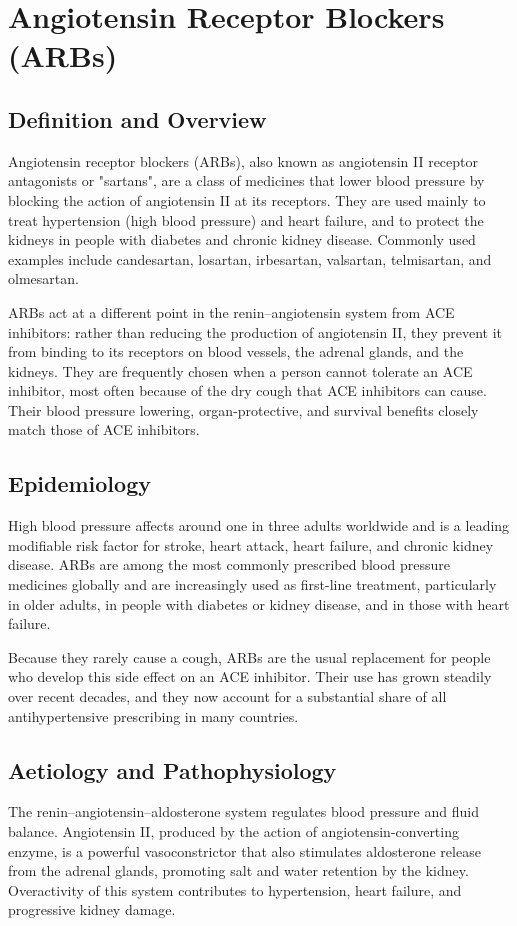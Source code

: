 \chapter{Angiotensin Receptor Blockers (ARBs)}

\section*{Definition and Overview}
Angiotensin receptor blockers (ARBs), also known as angiotensin II receptor antagonists or "sartans", are a class of medicines that lower blood pressure by blocking the action of angiotensin II at its receptors. They are used mainly to treat hypertension (high blood pressure) and heart failure, and to protect the kidneys in people with diabetes and chronic kidney disease. Commonly used examples include candesartan, losartan, irbesartan, valsartan, telmisartan, and olmesartan.

ARBs act at a different point in the renin--angiotensin system from ACE inhibitors: rather than reducing the production of angiotensin II, they prevent it from binding to its receptors on blood vessels, the adrenal glands, and the kidneys. They are frequently chosen when a person cannot tolerate an ACE inhibitor, most often because of the dry cough that ACE inhibitors can cause. Their blood pressure lowering, organ-protective, and survival benefits closely match those of ACE inhibitors.

\section*{Epidemiology}
High blood pressure affects around one in three adults worldwide and is a leading modifiable risk factor for stroke, heart attack, heart failure, and chronic kidney disease. ARBs are among the most commonly prescribed blood pressure medicines globally and are increasingly used as first-line treatment, particularly in older adults, in people with diabetes or kidney disease, and in those with heart failure.

Because they rarely cause a cough, ARBs are the usual replacement for people who develop this side effect on an ACE inhibitor. Their use has grown steadily over recent decades, and they now account for a substantial share of all antihypertensive prescribing in many countries.

\section*{Aetiology and Pathophysiology}
The renin--angiotensin--aldosterone system regulates blood pressure and fluid balance. Angiotensin II, produced by the action of angiotensin-converting enzyme, is a powerful vasoconstrictor that also stimulates aldosterone release from the adrenal glands, promoting salt and water retention by the kidney. Overactivity of this system contributes to hypertension, heart failure, and progressive kidney damage.

